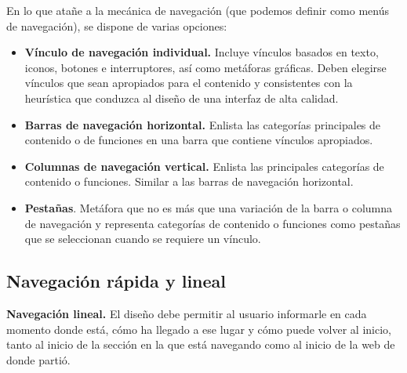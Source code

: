 \documentclass[a4paper,oneside,11pt]{book}
\begin{document}
	En lo que atañe a la mecánica de navegación (que podemos definir como menús de navegación), se dispone de varias opciones:
	\begin{itemize}
		\item \textbf{Vínculo de navegación individual.} Incluye vínculos basados en texto, iconos, botones e interruptores, así como metáforas gráficas. Deben elegirse vínculos que sean apropiados para el contenido y consistentes con la heurística que conduzca al diseño de una interfaz de alta calidad.
		\item \textbf{Barras de navegación horizontal.} Enlista las categorías principales de contenido o de funciones en una barra que contiene vínculos apropiados.
		\item \textbf{Columnas de navegación vertical.} Enlista las principales categorías de contenido o funciones. Similar a las barras de navegación horizontal.
		\item \textbf{Pestañas}. Metáfora que no es más que una variación de la barra o columna de navegación y representa categorías de contenido o funciones como pestañas que se seleccionan cuando se requiere un vínculo.
	\end{itemize} 

	
		
	\subsection{Navegación rápida y lineal} %
	\label{sub:nav_navegacion_rapida_y_lineal}
	
		\textbf{Navegación lineal.} El diseño debe permitir al usuario informarle en cada momento donde está, cómo ha llegado a ese lugar y cómo puede volver al inicio, tanto al inicio de la sección en la que está navegando como al inicio de la web de donde partió. 
\end{document}
